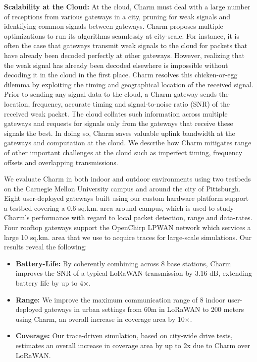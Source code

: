\noindent \textbf{Scalability at the Cloud:} At the cloud, Charm must deal
with a large number of receptions from various gateways in a city, pruning for
weak signals and identifying common signals between gateways. Charm proposes
multiple optimizations to run its algorithms seamlessly at city-scale. For
instance, it is often the case that gateways transmit weak signals to the
cloud for packets that have already been decoded perfectly at other gateways.
However, realizing that the weak signal has already been decoded elsewhere is
impossible without decoding it in the cloud in the first place. Charm resolves
this chicken-or-egg dilemma by exploiting the timing and geographical location
of the received signal. Prior to sending any signal data to the cloud, a Charm
gateway sends the location, frequency, accurate timing and signal-to-noise
ratio (SNR) of the received weak packet. The cloud collates such information
across multiple gateways and requests for signals only from the gateways that
receive these signals the best. In doing so, Charm saves valuable uplink
bandwidth at the gateways and computation at the cloud. We describe how Charm
mitigates range of other important challenges at the cloud such as imperfect
timing, frequency offsets and overlapping transmissions.

We evaluate Charm in both indoor and outdoor environments using two testbeds
on the Carnegie Mellon University campus and around the city of Pittsburgh.
Eight user-deployed gateways built using our custom hardware platform support
a testbed covering a 0.6 sq.km. area around campus, which is used to study
Charm's performance with regard to local packet detection, range and
data-rates. Four rooftop gateways support the OpenChirp LPWAN network which
services a large 10 sq.km. area that we use to acquire traces for large-scale
simulations. Our results reveal the following:

\begin{itemize}
    \item {\bf Battery-Life: } By coherently combining across 8 base stations,
        Charm improves the SNR of a typical LoRaWAN transmission by 3.16 dB,
        extending battery life by up to 4$\times$.
    \item {\bf Range: } We improve the maximum communication range of 8 indoor
        user-deployed gateways in urban settings from 60m in LoRaWAN to 200
        meters using Charm, an overall increase in coverage area by
        10$\times$.
    \item {\bf Coverage: } Our trace-driven simulation, based on city-wide
        drive tests, estimates an overall increase in coverage area by up to 2x due
        to Charm over LoRaWAN.
\end{itemize}

